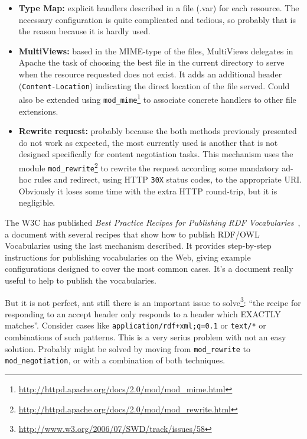 \begin{itemize}

  \item \textbf{Type Map:} explicit handlers described in a file (.var) for each 
        resource. The necessary configuration is quite complicated and tedious, 
        so probably that is the reason because it is hardly used.

  \item \textbf{MultiViews:} based in the MIME-type of the files, MultiViews 
        delegates in Apache the task of choosing the best file in the current 
        directory to serve when the resource requested does not exist. It adds 
        an additional header (\texttt{Content-Location}) indicating the direct 
        location of the file served. Could also be extended using 
        \texttt{mod\_mime}\footnote{\url{http://httpd.apache.org/docs/2.0/mod/mod_mime.html}}
        to associate concrete handlers to other file extensions.

  \item \textbf{Rewrite request:} probably because the both methods previously 
        presented do not work as expected, the most currently used is another 
        that is not designed specifically for content negotiation tasks. This
        mechanism uses the module 
        \texttt{mod\_rewrite}\footnote{\url{http://httpd.apache.org/docs/2.0/mod/mod_rewrite.html}}
        to rewrite the request according some mandatory ad-hoc rules and redirect,
        using HTTP \texttt{30X} status codes, to the appropriate URI. Obviously it loses 
        some time with the extra HTTP round-trip, but it is negligible.

\end{itemize}

The W3C has published \textit{Best Practice Recipes for Publishing RDF Vocabularies}~\cite{Recipes},
a document with several recipes that show how to publish RDF/OWL Vocabularies using
the last mechanism described. It provides step-by-step instructions for publishing 
vocabularies on the Web, giving example configurations designed to cover the most 
common cases. It's a document really useful to help to publish the vocabularies.

But it is not perfect, ant still there is an important issue to 
solve\footnote{\url{http://www.w3.org/2006/07/SWD/track/issues/58}}: 
``the recipe for responding to an accept header only responds to a header which
EXACTLY matches''. Consider cases like \texttt{application/rdf+xml;q=0.1} or 
\texttt{text/*} or combinations of such patterns. This is a very serius problem
with not an easy solution. Probably might be solved by moving from \texttt{mod\_rewrite}
to \texttt{mod\_negotiation}, or with a combination of both techniques.

